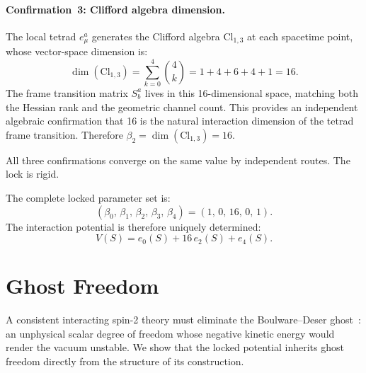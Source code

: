 \documentclass[a4paper,11pt]{article}
\begin{document}
\paragraph{Confirmation~3: Clifford algebra dimension.}
The local tetrad $e^a_\mu$ generates the Clifford algebra
$\mathrm{Cl}_{1,3}$ at each spacetime point, whose
vector-space dimension is:
\begin{equation}
  \dim(\mathrm{Cl}_{1,3}) = \sum_{k=0}^{4}\binom{4}{k}
  = 1 + 4 + 6 + 4 + 1 = 16.
\end{equation}
The frame transition matrix $S^a_b$ lives in this
16-dimensional space, matching both the Hessian rank
and the geometric channel count. This provides an
independent algebraic confirmation that 16 is the
natural interaction dimension of the tetrad frame
transition. Therefore
$\beta_2 = \dim(\mathrm{Cl}_{1,3}) = 16$.

All three confirmations converge on the same value by
independent routes. The lock is rigid.

The complete locked parameter set is:
\begin{equation}
  \boxed{(\beta_0,\, \beta_1,\, \beta_2,\, \beta_3,\,
  \beta_4) = (1,\, 0,\, 16,\, 0,\, 1).}
  \label{eq:lock}
\end{equation}
The interaction potential is therefore uniquely determined:
\begin{equation}
  V(S) = e_0(S) + 16\,e_2(S) + e_4(S).
\end{equation}

\section{Ghost Freedom}

A consistent interacting spin-2 theory must eliminate the
Boulware--Deser ghost~\cite{BD1972}: an unphysical scalar
degree of freedom whose negative kinetic energy would
render the vacuum unstable. We show that the locked
potential inherits ghost freedom directly from the
structure of its construction.
\end{document}
